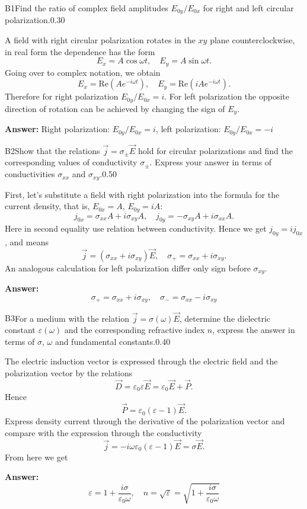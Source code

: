 \documentclass[11pt,a4paper]{article}
\begin{document}
\begin{solcard}{B1}{Find the ratio of complex field amplitudes $E_{0y}/E_{0x}$ for right and left circular polarization.}{0.30}

A field with right circular polarization rotates in the $xy$ plane counterclockwise, in real form the dependence has the form $$ E_{x} = A \cos \omega t, \quad E_{y} = A \sin \omega t. $$Going over to complex notation, we obtain $$ E_{x} = \mathrm{Re}(A e^{-i \omega t}), \quad E_{y} = \mathrm{Re}(iA e^{-i \omega t}). $$Therefore for right polarization $E_{0y}/E_{0x} = i$. For left polarization the opposite direction of rotation can be achieved by changing the sign of $E_y$.

\par\smallskip\noindent\textbf{Answer:} Right polarization: $E_{0y}/E_{0x} = i$, left polarization: $E_{0y}/E_{0x} =- i$
\end{solcard}

\begin{solcard}{B2}{Show that the relations $\vec{j} = \sigma_{\pm} \vec{E}$ hold for circular polarizations and find the corresponding values of conductivity $\sigma_{\pm}$. Express your answer in terms of conductivities $\sigma_{xx}$ and $\sigma_{xy}$.}{0.50}

First, let’s substitute a field with right polarization into the formula for the current density, that is, $E_{0x} = A$, $E_{0y }= iA$: $$ j_{0x} = \sigma_{xx} A + i \sigma_{xy} A, \quad j_{0y} = - \sigma_{xy} A + i \sigma_{xx} A. $$Here in second equality use relation between conductivity. Hence we get $j_{0y} = i j_{0x}$, and means $$ \vec{j} = (\sigma_{xx} + i \sigma_{xy}) \vec{E}, \quad \sigma_{+} =\sigma_{xx} + i \sigma_{xy}. $$An analogous calculation for left polarization differ only sign before $\sigma_{xy}$.

\par\smallskip\noindent\textbf{Answer:} $$ \sigma_{+} =\sigma_{xx} + i \sigma_{xy}, \quad \sigma_{-} =\sigma_{xx} - i \sigma_{xy} $$
\end{solcard}

\begin{solcard}{B3}{For a medium with the relation $\vec{j} = \sigma(\omega) \vec{E}$, determine the dielectric constant $\varepsilon(\omega)$ and the corresponding refractive index $n$, express the answer in terms of $\sigma$, $\omega$ and fundamental constants.}{0.40}

The electric induction vector is expressed through the electric field and the polarization vector by the relations $$ \vec{D} = \varepsilon_0 \varepsilon \vec{E}  = \varepsilon_0 \vec{E} + \vec{P}. $$Hence $$ \vec{P} = \varepsilon_0 (\varepsilon - 1) \vec{E}. $$Express density current through the derivative of the polarization vector and compare with the expression through the conductivity $$ \vec{j} = - i \omega  \varepsilon_0 (\varepsilon - 1) \vec{E} = \sigma \vec{E}. $$From here we get

\par\smallskip\noindent\textbf{Answer:} $$ \varepsilon = 1 + \frac{i \sigma}{\varepsilon_0 \omega}, \quad n = \sqrt{\varepsilon} = \sqrt{1 + \frac{i \sigma}{\varepsilon_0 \omega}} $$
\end{solcard}
\end{document}
